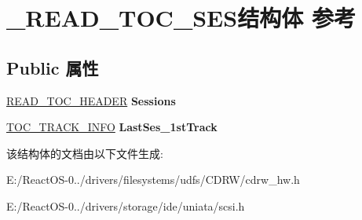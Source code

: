 \hypertarget{struct___r_e_a_d___t_o_c___s_e_s}{}\section{\+\_\+\+R\+E\+A\+D\+\_\+\+T\+O\+C\+\_\+\+S\+E\+S结构体 参考}
\label{struct___r_e_a_d___t_o_c___s_e_s}
\subsection*{Public 属性}
\begin{DoxyCompactItemize}
\item 
\mbox{\label{struct___r_e_a_d___t_o_c___s_e_s_af473bd23e3404b545e3073297f71b7fd}} 
\hyperlink{struct___r_e_a_d___t_o_c___h_e_a_d_e_r}{R\+E\+A\+D\+\_\+\+T\+O\+C\+\_\+\+H\+E\+A\+D\+ER} {\bfseries Sessions}
\item 
\mbox{\label{struct___r_e_a_d___t_o_c___s_e_s_a83e49cf67718fe4ef3534a29fc6dd65e}} 
\hyperlink{struct___t_o_c___t_r_a_c_k___i_n_f_o}{T\+O\+C\+\_\+\+T\+R\+A\+C\+K\+\_\+\+I\+N\+FO} {\bfseries Last\+Ses\+\_\+1st\+Track}
\end{DoxyCompactItemize}


该结构体的文档由以下文件生成\+:\begin{DoxyCompactItemize}
\item 
E\+:/\+React\+O\+S-\/0../drivers/filesystems/udfs/\+C\+D\+R\+W/cdrw\+\_\+hw.\+h\item 
E\+:/\+React\+O\+S-\/0../drivers/storage/ide/uniata/scsi.\+h\end{DoxyCompactItemize}

